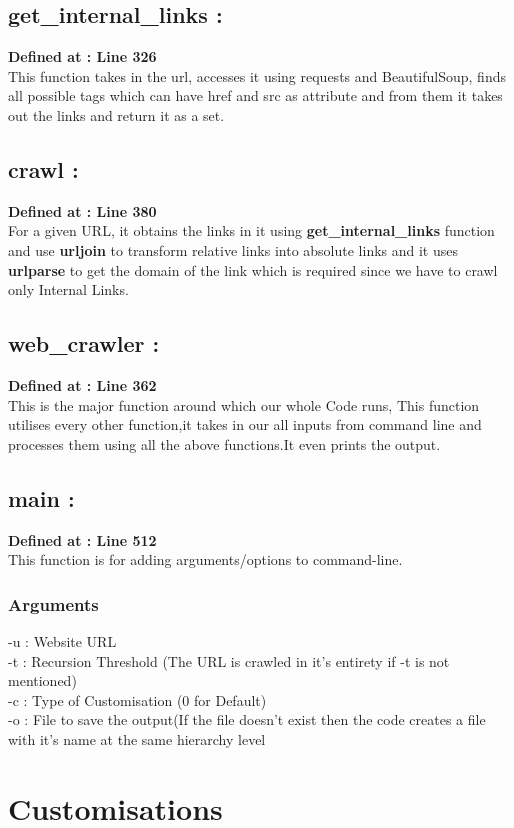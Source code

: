 \documentclass{article}
\begin{document}
\subsection{get\_internal\_links :}
    \textbf{Defined at : Line 326}\\[0.4cm]
    This function takes in the url, accesses it using requests and BeautifulSoup, finds all possible tags which can have href and src as attribute and from them it takes out the links and return it as a set.
\subsection{crawl : }
    \textbf{Defined at : Line 380}\\[0.4cm]
    For a given URL, it obtains the links in it using \textbf{get\_internal\_links} function and use \textbf{urljoin} to transform relative links into absolute links and it uses \textbf{urlparse} to get the domain of the link which is required since we have to crawl only Internal Links.
\subsection{web\_crawler : }
    \textbf{Defined at : Line 362}\\[0.4cm]
    This is the major function around which our whole Code runs, This function utilises every other function,it takes in our all inputs from command line and processes them using all the above functions.It even prints the output.
\subsection{main : }
    \textbf{Defined at : Line 512}\\[0.4cm]
    This function is for adding arguments/options to command-line.
    \subsubsection{Arguments}
    -u : Website URL \\
    -t : Recursion Threshold (The URL is crawled in it's entirety if -t is not mentioned)\\
    -c : Type of Customisation (0 for Default)\\
    -o : File to save the output(If the file doesn't exist then the code creates a file with it's name at the same hierarchy level
    

\section{Customisations}
\end{document}

